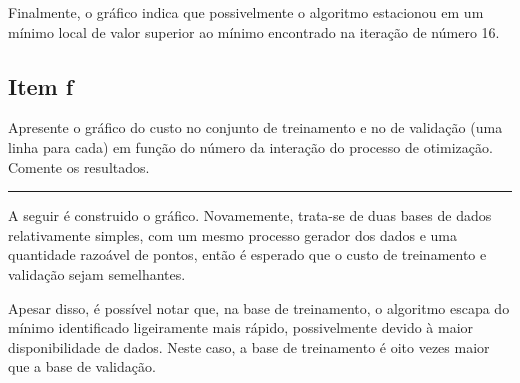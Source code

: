 \documentclass[
  a4paperpaper,
]{article}
\begin{document}
Finalmente, o gráfico indica que possivelmente o algoritmo estacionou em
um mínimo local de valor superior ao mínimo encontrado na iteração de
número 16.

\subsection{Item f}\label{item-f}

Apresente o gráfico do custo no conjunto de treinamento e no de
validação (uma linha para cada) em função do número da interação do
processo de otimização. Comente os resultados.

\begin{center}\rule{0.5\linewidth}{0.5pt}\end{center}

A seguir é construido o gráfico. Novamemente, trata-se de duas bases de
dados relativamente simples, com um mesmo processo gerador dos dados e
uma quantidade razoável de pontos, então é esperado que o custo de
treinamento e validação sejam semelhantes.

Apesar disso, é possível notar que, na base de treinamento, o algoritmo
escapa do mínimo identificado ligeiramente mais rápido, possivelmente
devido à maior disponibilidade de dados. Neste caso, a base de
treinamento é oito vezes maior que a base de validação.
\end{document}
